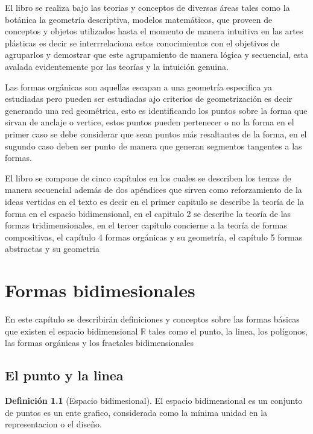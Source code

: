 \documentclass[
  16pt,
]{krantz}
\theoremstyle{definition}
\newtheorem{definition}{Definición}[chapter]
\theoremstyle{definition}
\theoremstyle{definition}
\theoremstyle{definition}
\theoremstyle{remark}
\begin{document}
El libro se realiza bajo las teorias y conceptos de diversas áreas tales como la botánica la geometría descriptiva, modelos matemáticos, que proveen de conceptos y objetos utilizados hasta el momento de manera intuitiva en las artes plásticas es decir se interrrelaciona estos conocimientos con el objetivos de agruparlos y demostrar que este agrupamiento de manera lógica y secuencial, esta avalada evidentemente por las teorías y la intuición genuina.

Las formas orgánicas son aquellas escapan a una geometría especifica ya estudiadas pero pueden ser estudiadas ajo criterios de geometrización es decir generando una red geométrica, esto es identificando los puntos sobre la forma que sirvan de anclaje o vertice, estos puntos pueden pertenecer o no la forma en el primer caso se debe considerar que sean puntos más resaltantes de la forma, en el sugundo caso deben ser punto de manera que generan segmentos tangentes a las formas.

El libro se compone de cinco capítulos en los cuales se describen los temas de manera secuencial además de dos apéndices que sirven como reforzamiento de la ideas vertidas en el texto es decir en el primer capitulo se describe la teoría de la forma en el espacio bidimensional, en el capitulo 2 se describe la teoría de las formas tridimensionales, en el tercer capítulo concierne a la teoría de formas compositivas, el capítulo 4 formas orgánicas y su geometría, el capítulo 5 formas abstractas y su geometria

\mainmatter

\hypertarget{formas-bidimesionales}{%
\chapter{Formas bidimesionales}\label{formas-bidimesionales}}

En este capítulo se describirán definiciones y conceptos sobre las formas básicas que existen el espacio bidimensional \(\mathbb{R}\) tales como el punto, la linea, los polígonos, las formas orgánicas y los fractales bidimensionales

\hypertarget{el-punto-y-la-linea}{%
\section{El punto y la linea}\label{el-punto-y-la-linea}}

\begin{definition}[Espacio bidimesional]
\protect\hypertarget{def:r2}{}{\label{def:r2} {} }El espacio bidimensional es un conjunto de puntos es un ente grafico, considerada como la mínima unidad en la representacion o el diseño.
\end{definition}
\end{document}
